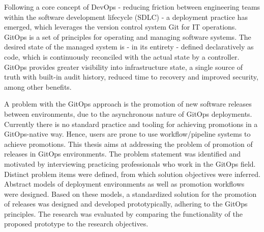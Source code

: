 
%







\noindent
Following a core concept of DevOps
- reducing friction between engineering teams within the software development lifecycle (SDLC) -
a deployment practice has emerged,
which leverages the version control system Git for IT operations.
GitOps is a set of principles for operating and managing software systems.
The desired state of the managed system is
- in its entirety -
defined declaratively as code,
which is continuously reconciled with the actual state by a controller.
GitOps provides greater visibility into infrastructure state,
a single source of truth with built-in audit history,
reduced time to recovery and improved security,
among other benefits.

A problem with the GitOps approach is the promotion of new software releases between environments,
due to the asynchronous nature of GitOps deployments.
Currently there is no standard practice and tooling for achieving promotions in a GitOps-native way.
Hence, users are prone to use workflow/pipeline systems to achieve promotions.
This thesis aims at addressing the problem
of promotion of releases in GitOps environments.
The problem statement was identified and motivated by
interviewing practicing professionals who work in the GitOps field.
Distinct problem items were defined, from which solution objectives were inferred.
Abstract models of deployment environments as well as promotion workflows
were designed.
Based on these models,
a standardized solution for the promotion of releases
was designed and developed prototypically,
adhering to the GitOps principles.
The research was evaluated by
comparing the functionality of the proposed prototype
to the research objectives.

